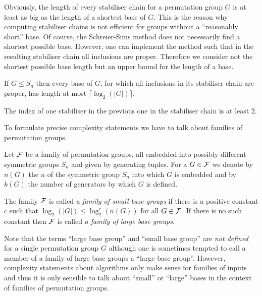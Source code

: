 Obviously, the length of every stabiliser chain for a permutation group 
$G$ is at least as big as the length of a shortest base of $G$.
This is the reason why computing stabiliser chains is not efficient
for groups without a ``reasonably short'' base. Of course, the
Schreier-Sims method does not necessarily find a shortest possible base.
However, one can implement the method such that in the resulting
stabiliser chain all inclusions are proper.
Therefore we consider not the shortest possible base length but
an upper bound for the length of a base.

\begin{Prop}
If $G \le S_n$ then every base of $G$, for which all inclusions in its
stabiliser chain are proper, has length at most $\lceil \log_2(|G|) \rceil$.
\end{Prop}
\proofbeg
The index of one stabiliser in the previous one in the stabiliser chain is
at least $2$.
\proofend

To formulate precise complexity statements we have to talk about families
of permutation groups.

\begin{Def}
\label{SmallLargeBase}
%
Let $\mathcal{F}$ be a family of permutation groups, all embedded into
possibly different symmetric groups $S_n$ and given by generating tuples. 
For a $G \in \mathcal{F}$ we denote 
by $n(G)$ the $n$ of the symmetric group $S_n$ into which $G$ is embedded
and by $k(G)$ the number of generators by which $G$ is defined.

The family $\mathcal{F}$ is called \emph{a family of small base groups} if there
is a positive constant $c$ such that $\log_2(|G|) \le \log^c_2(n(G))$ for all
$G \in \mathcal{F}$. If there is no such constant then $\mathcal{F}$ is called
\emph{a family of large base groups}.
\end{Def}

\begin{Rem}
Note that the terms ``large base group'' and ``small base group'' are
\emph{not defined} for a single permutation group $G$ although one is
sometimes tempted to call a member of a family of large base groups
a ``large base group''. However, complexity statements about algorithms
only make sense for families of inputs and thus it is only sensible to
talk about ``small'' or ``large'' bases in the context of families of
permutation groups.
\end{Rem}

